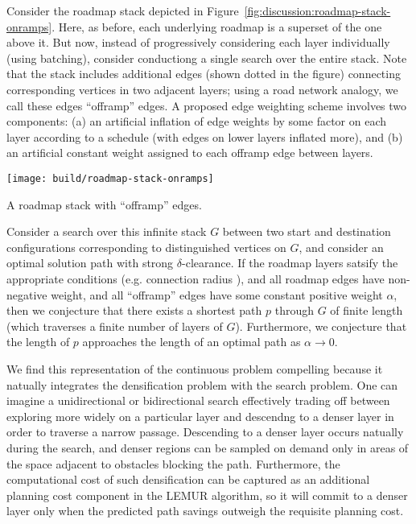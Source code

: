 Consider the roadmap stack depicted
in Figure~\ref{fig:discussion:roadmap-stack-onramps}.
Here, as before,
each underlying roadmap is a superset of the one above it.
But now,
instead of progressively considering each layer individually
(using batching),
consider conductiong a single search over the entire stack.
Note that the stack includes additional edges
(shown dotted in the figure)
connecting corresponding vertices in two adjacent layers;
using a road network analogy,
we call these edges ``offramp'' edges.
A proposed edge weighting scheme involves two components:
(a) an artificial inflation of edge weights by some factor
on each layer according to a schedule
(with edges on lower layers inflated more),
and (b) an artificial constant weight assigned to each offramp edge
between layers.


\begin{marginfigure}
   \centering
   \texttt{[image: build/roadmap-stack-onramps]}
   \caption{A roadmap stack with ``offramp'' edges.}
   \label{fig:discussion:roadmap-stack-onramps}
\end{marginfigure}

Consider a search over this infinite stack $G$
between two start and destination
configurations corresponding to distinguished vertices on $G$,
and consider an optimal solution path with strong $\delta$-clearance.
If the roadmap layers satsify the appropriate conditions
(e.g. connection radius
\citep{karaman2011samplingoptimal, janson2015deterministicsampling}),
and all roadmap edges have non-negative weight,
and all ``offramp'' edges have some constant positive weight $\alpha$,
then we conjecture that there exists a shortest path $p$ through $G$
of finite length (which traverses a finite number of layers of $G$).
Furthermore,
we conjecture that the length of $p$ approaches the length of an
optimal path as $\alpha \rightarrow 0$.

We find this representation of the continuous problem compelling
because it natually integrates the densification problem with
the search problem.
One can imagine a unidirectional or bidirectional search
effectively trading off between
exploring more widely on a particular layer
and descendng to a denser layer in order to traverse a narrow passage.
Descending to a denser layer occurs natually during the search,
and denser regions can be sampled on demand only in areas of the space
adjacent to obstacles blocking the path.
Furthermore,
the computational cost of such densification can be captured as
an additional planning cost component in the LEMUR algorithm,
so it will commit to a denser layer only when the predicted path
savings outweigh the requisite planning cost.

